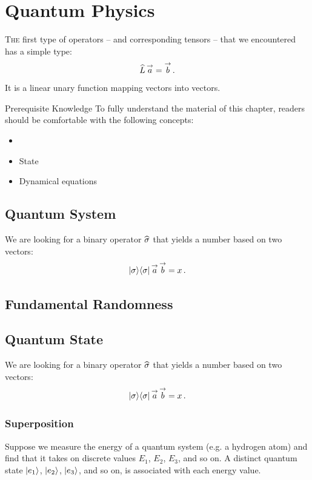 \graphicspath{{../05QuantumPhysics/pics/}}

\chapter{Quantum Physics}\label{ch:QuantumPhysics}
\lettrine[lines=2]{\color{darkocre}T}{he} first type of operators -- and
corresponding tensors -- that we encountered has a simple type:
\[
\widehat{L}\,\overset{\rightarrow}{a} = \overset{\rightarrow}{b}\,.
\]
It is a linear unary function mapping vectors into vectors.


\begin{myprereq}{Prerequisite Knowledge}
To fully understand the material of this chapter, readers should be comfortable with the following concepts:

\begin{itemize}
	\item \phantom{phantom}
	\vspace{-0.5cm}
	\item State
	\item Dynamical equations
\end{itemize}	
\end{myprereq}

\section{Quantum System}\label{sec:QuantumSystem}
We are looking for a binary operator $\widehat{\sigma}$ that yields a number
based on two vectors:
\[
|{\sigma}\rangle\langle{\sigma}|\,\overset{\rightarrow}{a}\,\overset{\rightarrow}{b}=x\,.
\]

\section{Fundamental Randomness}



\section{Quantum State}\label{sec:QuantumState}
We are looking for a binary operator $\widehat{\sigma}$ that yields a number
based on two vectors:
\[
|{\sigma}\rangle\langle{\sigma}|\,\overset{\rightarrow}{a}\,\overset{\rightarrow}{b}=x\,.
\]

\subsection{Superposition}
Suppose we measure the energy of a quantum system (e.g. a hydrogen atom) and find that it takes on discrete values $E_1$, $E_2$, $E_3$, and so on. A distinct quantum state $|{e_1}\rangle$, $|{e_2}\rangle$, $|{e_3}\rangle$, and so on, is associated with each energy value.

